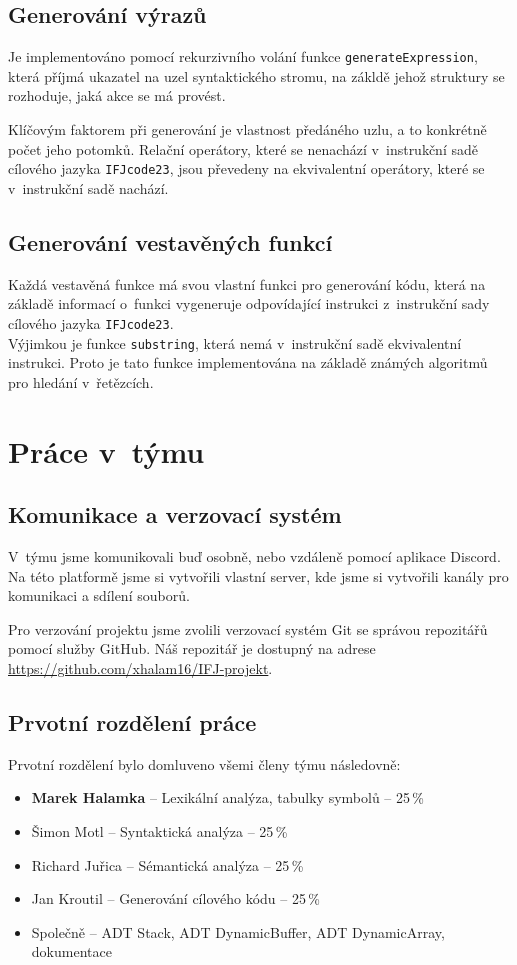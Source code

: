 \documentclass[a4paper, 11pt]{article}
\begin{document}
	\subsection{Generování výrazů}
	\label{sec:gen_expr}
	Je implementováno pomocí rekurzivního volání funkce \texttt{generateExpression}, která příjmá ukazatel na uzel syntaktického stromu, na zákldě jehož struktury se rozhoduje, jaká akce se má provést.
	\par\noindent Klíčovým faktorem při generování je vlastnost předáného uzlu, a to konkrétně počet jeho potomků. Relační operátory, které se nenachází v~instrukční sadě cílového jazyka \texttt{IFJcode23}, jsou převedeny na ekvivalentní operátory, které se v~instrukční sadě nachází.
	\subsection{Generování vestavěných funkcí}
	\label{sec:gen_builtin}
	Každá vestavěná funkce má svou vlastní funkci pro generování kódu, která na základě informací o~funkci vygeneruje odpovídající instrukci z~instrukční sady cílového jazyka \texttt{IFJcode23}. \\Výjimkou je funkce \texttt{substring}, která nemá v~instrukční sadě ekvivalentní instrukci. Proto je tato funkce implementována na základě známých algoritmů pro hledání v~řetězcích.

	\newpage
	\section{Práce v~týmu}

	\subsection{Komunikace a verzovací systém}
	V~týmu jsme komunikovali buď osobně, nebo vzdáleně pomocí aplikace Discord. Na této platformě jsme si vytvořili vlastní server, kde jsme si vytvořili kanály pro komunikaci a sdílení souborů. 
	\par\noindent Pro verzování projektu jsme zvolili verzovací systém Git se správou repozitářů pomocí služby GitHub. Náš repozitář je dostupný na adrese \url{https://github.com/xhalam16/IFJ-projekt}.


	\subsection{Prvotní rozdělení práce}
	Prvotní rozdělení bylo domluveno všemi členy týmu následovně:
	\begin{itemize}
		\item \textbf{Marek Halamka} -- Lexikální analýza, tabulky symbolů  -- 25\,\%
		\item Šimon Motl -- Syntaktická analýza -- 25\,\%
		\item Richard Juřica -- Sémantická analýza -- 25\,\%
		\item Jan Kroutil -- Generování cílového kódu -- 25\,\% 
		\item Společně -- ADT Stack, ADT DynamicBuffer, ADT DynamicArray, dokumentace
	\end{itemize}
\end{document}
